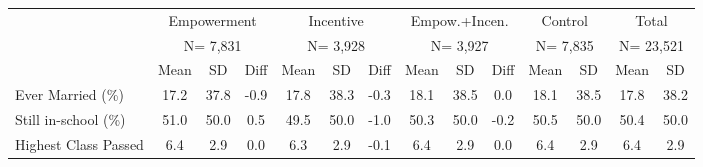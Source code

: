 \begin{tabular}{lccccccccccccc}
\\
\toprule
 & \multicolumn{3}{c}{Empowerment} & \multicolumn{3}{c}{Incentive} & \multicolumn{3}{c}{Empow.+Incen.} & \multicolumn{2}{c}{Control} & \multicolumn{2}{c}{Total} \\
 & \multicolumn{3}{c}{N=    7,831} & \multicolumn{3}{c}{N=    3,928} & \multicolumn{3}{c}{N=    3,927} & \multicolumn{2}{c}{N=    7,835} & \multicolumn{2}{c}{N=   23,521} \\
\cmidrule(lr){2-4} \cmidrule(lr){5-7} \cmidrule(lr){8-10} \cmidrule(lr){11-12} \cmidrule(lr){13-14}
 & Mean & SD & Diff & Mean & SD & Diff & Mean & SD & Diff & Mean & SD & Mean & SD \\
\midrule
Ever Married (\%) &      17.2 &      37.8 &      -0.9 &      17.8 &      38.3 &      -0.3 &      18.1 &      38.5 &       0.0 &      18.1 &      38.5  &      17.8 &      38.2 \\
Still in-school (\%) &      51.0 &      50.0 &       0.5 &      49.5 &      50.0 &      -1.0 &      50.3 &      50.0 &      -0.2 &      50.5 &      50.0  &      50.4 &      50.0 \\
Highest Class Passed &       6.4 &       2.9 &       0.0 &       6.3 &       2.9 &      -0.1 &       6.4 &       2.9 &       0.0 &       6.4 &       2.9  &       6.4 &       2.9 \\
\bottomrule
\end{tabular}
